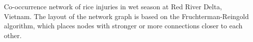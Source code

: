 Co-occurrence network of rice injuries in wet season at Red River Delta, Vietnam. The layout of the network graph is based on the Fruchterman-Reingold algorithm, which places nodes with stronger or more connections closer to each other.
        \label{fig:networkRR_ws}